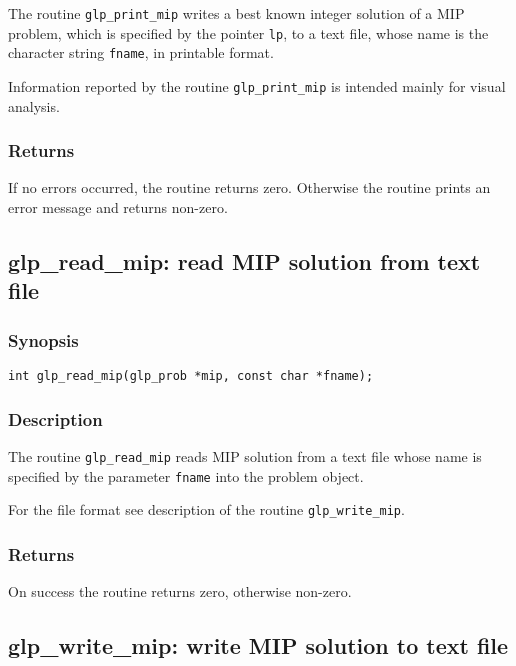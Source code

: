 The routine \verb|glp_print_mip| writes a best known integer solution
of a MIP problem, which is specified by the pointer \verb|lp|, to a text
file, whose name is the character string \verb|fname|, in printable
format.

Information reported by the routine \verb|glp_print_mip| is intended
mainly for visual analysis.

\subsubsection*{Returns}

If no errors occurred, the routine returns zero. Otherwise the routine
prints an error message and returns non-zero.

\newpage

\subsection{glp\_read\_mip: read MIP solution from text file}

\subsubsection*{Synopsis}

\begin{verbatim}
int glp_read_mip(glp_prob *mip, const char *fname);
\end{verbatim}

\subsubsection*{Description}

The routine \verb|glp_read_mip| reads MIP solution from a text file
whose name is specified by the parameter \verb|fname| into the problem
object.

For the file format see description of the routine \verb|glp_write_mip|.

\subsubsection*{Returns}

On success the routine returns zero, otherwise non-zero.

\subsection{glp\_write\_mip: write MIP solution to text file}

